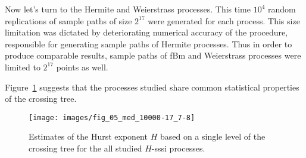 Now let's turn to the Hermite and Weierstrass processes. This time $10^4$ random
replications of sample paths of size $2^{17}$ were generated for each process.
This size limitation was dictated by deteriorating numerical accuracy of the procedure,
responsible for generating sample paths of Hermite processes. Thus in order to produce
comparable results, sample paths of fBm and Weierstrass processes were limited to $2^{17}$
points as well.

Figure~\ref{fig:all_hurst_crossing_tree} suggests that the processes studied share common
statistical properties of the crossing tree.
\begin{figure}[htb]\begin{center}
    \texttt{[image: images/fig\_05\_med\_10000-17\_7-8]}
    \caption{Estimates of the Hurst exponent $H$ based on a single level of the crossing tree for
    the all studied $H$-sssi processes.}
\label{fig:all_hurst_crossing_tree}
\end{center}\end{figure}

